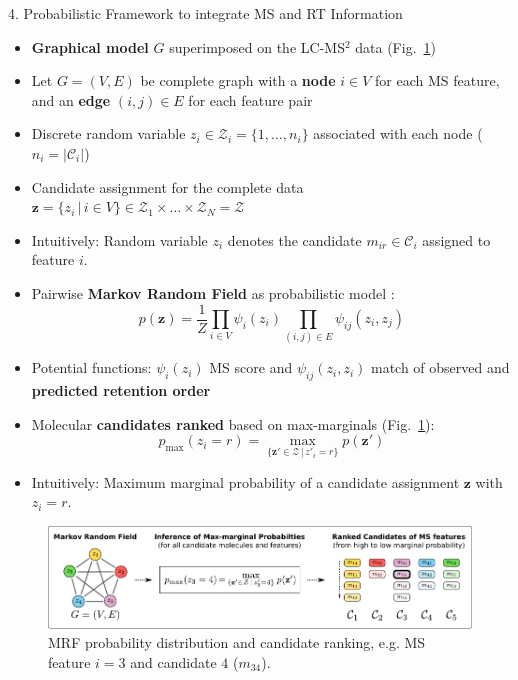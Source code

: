 \documentclass{beamer}
\newcommand{\ms}{MS}
\newcommand{\lc}{LC}
\newcommand{\msms}{\ms$^2$}
\newcommand{\lcmsms}{\lc-\msms}
\newcommand{\cands}{\mathcal{C}}
\newcommand{\seqlength}{N}
\begin{document}
\begin{frame}{}
\begin{columns}[T]
\hfill
{}
    \begin{block}{{\normalsize 4. Probabilistic Framework to integrate \ms{} and RT Information}}
    \begin{itemize}
        \item \textbf{Graphical model} $G$ superimposed on the \lcmsms{} data (Fig.~\ref{fig:mrf_and_ranking})
        \item Let $G=(V,E)$ be complete graph with a \textbf{node} $i\in V$ for each \ms{} feature, and an \textbf{edge} $(i,j)\in E$ for each feature pair 
        \item Discrete random variable $z_i\in\mathcal{Z}_i=\{1,\ldots,n_i\}$ associated with each node ($n_i=|\cands_i|$)
        \item Candidate assignment for the complete data $\mathbf{z}=\{z_i\,|\,i\in V\}\in\mathcal{Z}_1\times\ldots\times\mathcal{Z}_\seqlength=\mathcal{Z}$
        \item Intuitively: Random variable $z_i$ denotes the candidate $m_{ir}\in\mathcal{C}_i$ assigned to feature $i$.
        \item Pairwise \textbf{Markov Random Field} as probabilistic model \cite{MacKay2005}:
            \begin{equation}
                p(\mathbf{z})=\frac{1}{Z}\prod_{i\in V}\psi_i(z_i)\prod_{(i,j)\in E}\psi_{ij}(z_i,z_j)
                \label{eq:mrf}
            \end{equation} 
        \item Potential functions: $\psi_i(z_i)$ \ms{} score and $\psi_{ij}(z_i,z_i)$ match of observed and \textbf{predicted retention order}
        \item Molecular \textbf{candidates ranked} based on max-marginals \cite{MacKay2005} (Fig.~\ref{fig:mrf_and_ranking}):
            \begin{equation}
                p_{\max}(z_i=r)=\underset{\{\mathbf{z}'\in\mathcal{Z}\,|\,z'_i=r\}}{\max}p(\mathbf{z}')
            \end{equation}
        \item Intuitively: Maximum marginal probability of a candidate assignment $\mathbf{z}$ with $z_i=r$.
    \end{itemize}
    \vspace{0.25cm}
    \begin{figure}
        \centering
        \includegraphics[width=\textwidth]{images/mrf_and_ranking.pdf}
        \caption{MRF probability distribution and candidate ranking, e.g. \ms{} feature $i=3$ and candidate $4$ ($m_{34}$).}
        \label{fig:mrf_and_ranking}
    \end{figure}
    \vspace{-0.75cm}
    \end{block}


\end{columns}
\end{frame}
\end{document}
